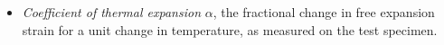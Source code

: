 \begin{itemize}
  \item {\em Coefficient of thermal expansion} $\alpha$, the fractional change in free expansion strain for a unit change in temperature, as measured on the test specimen.

\end{itemize}
